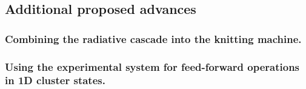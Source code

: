 \subsection{Additional proposed advances}
\subsubsection{Combining the radiative cascade into the knitting machine.}
\subsubsection{Using the experimental system for feed-forward operations in 1D cluster states.}